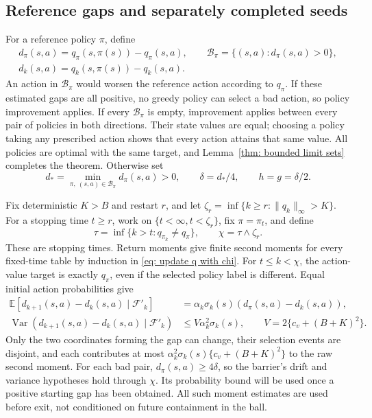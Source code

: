 \subsection{Reference gaps and separately completed seeds}
For a reference policy $\pi$, define
\begin{equation}\label{eq:gaps}
\begin{gathered}
d_\pi(s,a)=q_\pi(s,\pi(s))-q_\pi(s,a),\qquad
\mathcal B_\pi=\{(s,a):d_\pi(s,a)>0\},\\
d_k(s,a)=q_k(s,\pi(s))-q_k(s,a).
\end{gathered}
\end{equation}
An action in $\mathcal B_\pi$ would worsen the reference action according to $q_\pi$. If these estimated gaps
are all positive, no greedy policy can select a bad action, so policy improvement applies. If
every $\mathcal B_\pi$ is empty, improvement applies between every pair of policies in both directions.
Their state values are equal; choosing a policy taking any prescribed action shows that every
action attains that same value. All policies are optimal with the same target, and Lemma~\ref{thm: bounded limit sets}
completes the theorem. Otherwise set
\begin{equation}\label{eq:constants}
d_* = \min_{\pi,\ (s,a)\in\mathcal B_\pi}d_\pi(s,a)>0,\qquad
\delta=d_*/4,\qquad h=g=\delta/2.
\end{equation}

Fix deterministic $K>B$ and restart $r$, and let $\zeta_r=\inf\{k\ge r:\|q_k\|_\infty>K\}$. For a
stopping time $t\ge r$, work on $\{t<\infty,t<\zeta_r\}$, fix $\pi=\pi_t$, and define
\begin{equation}\label{eq:stops}
\tau=\inf\{k>t:q_{\pi_k}\ne q_\pi\},\qquad \chi=\tau\wedge\zeta_r.
\end{equation}
These are stopping times. Return moments give finite second moments for every fixed-time
table by induction in \eqref{eq: update q with chi}. For $t\le k<\chi$, the action-value target is exactly $q_\pi$, even if the
selected policy label is different. Equal initial action probabilities give
\begin{align}
\mathbb E[d_{k+1}(s,a)-d_k(s,a)\mid\mathcal F'_k]
&=\alpha_k\sigma_k(s)(d_\pi(s,a)-d_k(s,a)),\label{eq:gapdrift}\\
\operatorname{Var}(d_{k+1}(s,a)-d_k(s,a)\mid\mathcal F'_k)
&\le V\alpha_k^2\sigma_k(s),\qquad V=2\{c_v+(B+K)^2\}.\label{eq:gapvariance}
\end{align}
Only the two coordinates forming the gap can change, their selection events are disjoint,
and each contributes at most $\alpha_k^2\sigma_k(s)\{c_v+(B+K)^2\}$ to the raw second moment. For each bad pair, $d_\pi(s,a)\ge4\delta$, so the barrier's drift and variance hypotheses hold through $\chi$. Its probability bound will be used once a positive starting gap has been obtained. All such moment estimates
are used before exit, not conditioned on future containment in the ball.

